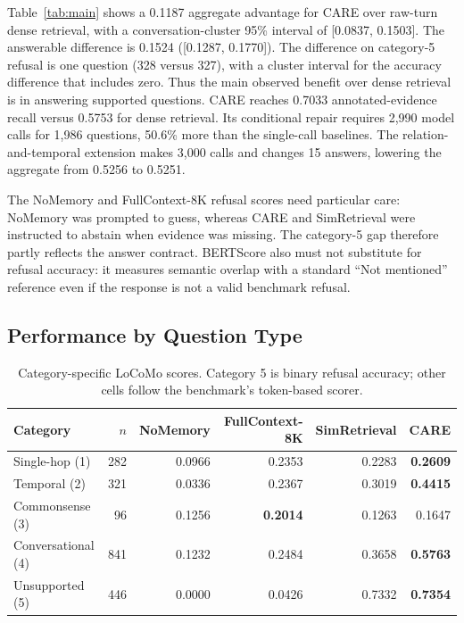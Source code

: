 \documentclass[11pt]{article}
\newcommand{\care}{\textsc{CARE}}
\begin{document}
Table~\ref{tab:main} shows a 0.1187 aggregate advantage for \care{} over
raw-turn dense retrieval, with a conversation-cluster 95\% interval of
[0.0837, 0.1503]. The answerable difference is 0.1524
([0.1287, 0.1770]). The difference on category-5 refusal is one question
(328 versus 327), with a cluster interval for the accuracy difference that
includes zero. Thus the main observed benefit over dense retrieval is in
answering supported questions. \care{} reaches 0.7033 annotated-evidence
recall versus 0.5753 for dense retrieval. Its conditional repair requires
2,990 model calls for 1,986 questions, 50.6\% more than the single-call
baselines. The relation-and-temporal extension makes 3,000 calls and
changes 15 answers, lowering the aggregate from 0.5256 to 0.5251.

The NoMemory and FullContext-8K refusal scores need particular care:
NoMemory was prompted to guess, whereas \care{} and SimRetrieval were
instructed to abstain when evidence was missing. The category-5 gap
therefore partly reflects the answer contract. BERTScore also must not
substitute for refusal accuracy: it measures semantic overlap with a
standard ``Not mentioned'' reference even if the response is not a valid
benchmark refusal.

\subsection{Performance by Question Type}

\begin{table}[t]
\centering
\caption{Category-specific LoCoMo scores. Category 5 is binary refusal
accuracy; other cells follow the benchmark's token-based scorer.}
\label{tab:category}
\small
\begin{tabular}{lrrrrr}
\toprule
Category & $n$ & NoMemory & FullContext-8K & SimRetrieval & \care{} \\
\midrule
Single-hop (1) & 282 & 0.0966 & 0.2353 & 0.2283 & \textbf{0.2609} \\
Temporal (2) & 321 & 0.0336 & 0.2367 & 0.3019 & \textbf{0.4415} \\
Commonsense (3) & 96 & 0.1256 & \textbf{0.2014} & 0.1263 & 0.1647 \\
Conversational (4) & 841 & 0.1232 & 0.2484 & 0.3658 & \textbf{0.5763} \\
Unsupported (5) & 446 & 0.0000 & 0.0426 & 0.7332 & \textbf{0.7354} \\
\bottomrule
\end{tabular}
\end{table}
\end{document}
